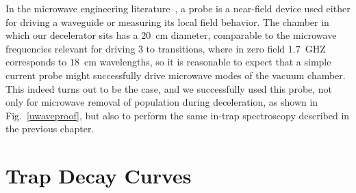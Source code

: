In the microwave engineering literature~\cite[Sec.~4.7]{Pozar2009}, a probe is a near-field device used either for driving a waveguide or measuring its local field behavior. 
The chamber in which our decelerator sits has a $20$~cm diameter, comparable to the microwave frequencies relevant for driving \f3 to  transitions, where in zero field $1.7$~GHZ corresponds to $18$~cm wavelengths, so it is reasonable to expect that a simple current probe might successfully drive microwave modes of the vacuum chamber.
This indeed turns out to be the case, and we successfully used this probe, not only for microwave removal of population during deceleration, as shown in Fig.~\ref{uwaveproof}, but also to perform the same in-trap spectroscopy described in the previous chapter.

\section{Trap Decay Curves}

